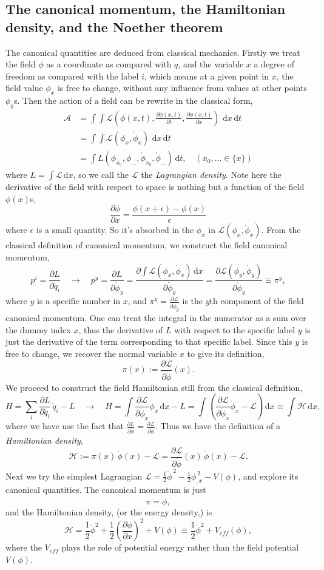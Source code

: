 \documentclass{article}
\newcommand{\be}{\begin{equation}}
\newcommand{\ee}{\end{equation}}
\newcommand{\bs}{\be\begin{split}}
\newcommand{\dif}{\,\mathrm{d}}
\newcommand{\p}{\partial}
\newcommand{\1}{\left}
\newcommand{\2}{\right}
\newcommand{\ma}{\mathcal}
\begin{document}
\subsection{The canonical momentum, the Hamiltonian density, and the Noether theorem}
The canonical quantities are deduced from classical mechanics. Firstly we treat the field $\phi$ as a coordinate as compared with $q$, and the variable $x$ a degree of freedom as compared with the label $i$, which means at a given point in $x$, the field value $\phi_x$ is free to change, without any influence from values at other points $\phi_y$s. Then the action of a field can be rewrite in the classical form,
\bs
\ma A&=\int\int \ma L(\phi(x,t), \frac{\p\phi(x,t)}{\p t}, \frac{\p\phi(x,t)}{\p x}) \,\dif x \dif t \\
&=\int\int \ma L(\phi_x, \dot \phi_x) \,\dif x \dif t \\
&=\int L(\phi_{x_0},\phi_{...}, \dot \phi_{x_0}, \dot \phi_{...}) \dif t, \quad (x_0,...\in \{x\})
\end{split}\ee
where $L=\int \ma L \dif x$, so we call the $\ma L$ the \textit{Lagrangian density}.
Note here the derivative of the field with respect to space is nothing but a function of the field $\phi(x)$s,
\be
\frac{\p\phi}{\p x}=\frac{\phi(x+\epsilon)-\phi(x)}{\epsilon}
\ee
where $\epsilon$ is a small quantity. So it's absorbed in the $\phi_x$ in $\ma L(\phi_x, \dot \phi_x)$.
From the classical definition of canonical momentum, we construct the field canonical momentum,
\be
p^i=\frac{\p L}{\p \dot q_i} \quad\rightarrow\quad p^y=\frac{\p L}{\p \dot \phi_y}= \frac{\p \int\ma L(\phi_x, \dot \phi_x)\dif x}{\p \dot \phi_y} = \frac{\p \ma L(\phi_y, \dot \phi_y)}{\p \dot \phi_y} \equiv \pi^y,
\ee
where $y$ is a specific number in $x$, and $\pi^y=\frac{\p \ma L}{\p \dot \phi_y}$ is the $y$th component of the field canonical momentum. One can treat the integral in the numerator as a sum over the dummy index $x$, thus the derivative of $L$ with respect to the specific label $y$ is just the derivative of the term corresponding to that specific label. Since this $y$ is free to change, we recover the normal variable $x$ to give its definition,
\be
\pi(x):=\frac{\p \ma L}{\p \dot \phi}(x).
\ee
We proceed to construct the field Hamiltonian still from the classical definition,
\be
H=\sum_i \frac{\p L}{\p \dot q_i} \,\dot q_i -L \quad\rightarrow\quad 
H=\int \frac{\p \ma L}{\p \dot \phi_x} \dot \phi_x \dif x - L 
=\int \1(\frac{\p \ma L}{\p \dot \phi_x} \dot \phi_x - \ma L \2)\dif x
\equiv \int \ma H \dif x,
\ee
where we have use the fact that $\frac{\p L}{\p \dot \phi}=\frac{\p\ma L}{\p\dot \phi}$. Thus we have the definition of a \textit{Hamiltonian density},
\be
\ma H := \pi(x) \,\dot\phi(x) - \ma L = \frac{\p \ma L}{\p \dot \phi}(x) \,\dot \phi(x) - \ma L.
\ee
Next we try the simplest Lagrangian $\ma L = \frac 1 2 \dot \phi^{\,2} - \frac1 2\phi_{,x}^{\,2}- V(\phi)$, and explore its canonical quantities. The canonical momentum is just
\be
\pi=\dot\phi,
\ee
and the Hamiltonian density, (or the energy density,) is
\be
\ma H=\frac 1 2 \dot \phi^{2} + \frac1 2\1(\frac{\p\phi}{\p x}\2)^{2}+ V(\phi)\equiv \frac 1 2 \dot \phi^{2} + V_{eff}(\phi),
\ee
where the $V_{eff}$ plays the role of potential energy rather than the field potential $V(\phi)$.\\
\end{document}

